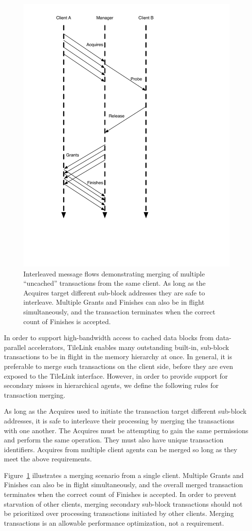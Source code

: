 \begin{figure}[p]
\centering
\includegraphics[width=0.5\columnwidth]{tilelink/figures/acq-merge.pdf}
\caption[Interleaved message flows merging multiple ``uncached'' transactions.]{
Interleaved message flows demonstrating merging of multiple ``uncached'' transactions from the same client.
As long as the Acquires target different sub-block addresses they are safe to interleave.
Multiple Grants and Finishes can also be in flight simultaneously, and the transaction terminates when the correct count of Finishes is accepted.}
\label{fig:acq-merge}
\end{figure}

In order to support high-bandwidth access to cached data blocks from data-parallel accelerators, TileLink enables many outstanding built-in, sub-block transactions
to be in flight in the memory hierarchy at once.
In general, it is preferable to merge such transactions on the client side, before they are even exposed to the TileLink interface.
However, in order to provide support for secondary misses in hierarchical agents, we define the following rules for transaction merging.

As long as the Acquires used to initiate the transaction target different sub-block addresses, it is safe to interleave their processing by merging the transactions with one another.
The Acquires must be attempting to gain the same permissions and perform the same operation.
They must also have unique transaction identifiers.
Acquires from multiple client agents can be merged so long as they meet the above requirements.

Figure~\ref{fig:acq-merge} illustrates a merging scenario from a single client.
Multiple Grants and Finishes can also be in flight simultaneously, and the overall merged transaction terminates when the correct count of Finishes is accepted.
In order to prevent starvation of other clients, merging secondary sub-block transactions should not be prioritized over processing transactions initiated by other clients.
Merging transactions is an allowable performance optimization, not a requirement.

